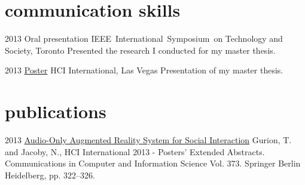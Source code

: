 \documentclass[]{friggeri-cv}  %
\begin{document}

\section{communication skills}

\begin{entrylist}

    \entry
    {2013}
    {Oral presentation}
    {IEEE International Symposium on Technology and Society, Toronto}
    {Presented the research I conducted for my master thesis.}

\end{entrylist}
\begin{entrylist}

    \entry
    {2013}
    {\href{https://db.tt/Rx7FnAxn}{Poster}}
    {HCI International, Las Vegas}
    {Presentation of my master thesis.}

\end{entrylist}


\section{publications}

\begin{entrylist}

    \entry
    {2013}
    {\href{http://db.tt/zpgwMFKJ}{Audio-Only Augmented Reality System for Social Interaction}}
    {}
    {Gurion, T. and Jacoby, N., HCI International 2013 - Posters’ Extended Abstracts. Communications in Computer and Information Science Vol. 373. Springer Berlin Heidelberg, pp. 322–326.}

\end{entrylist}
\end{document}
